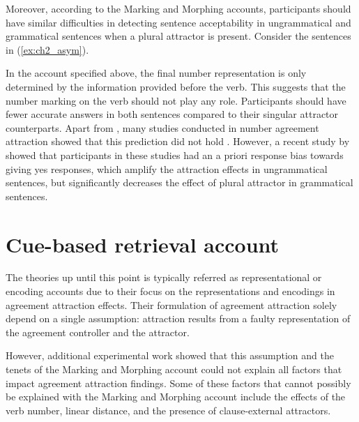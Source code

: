 Moreover, according to the Marking and Morphing accounts, participants should have similar difficulties in detecting sentence acceptability in ungrammatical and grammatical sentences when a plural attractor is present. Consider the sentences in (\ref{ex:ch2_asym}). 

\ea \label{ex:ch2_asym}
  \z
\z

In the account specified above, the final number representation is only determined by the information provided before the verb. This suggests that the number marking on the verb should not play any role. Participants should have fewer accurate answers in both sentences compared to their singular attractor counterparts. Apart from , many studies conducted in number agreement attraction showed that this prediction did not hold \citep[See][for an overview]{HammerlyEtAl2019}. However, a recent study by  showed that participants in these studies had an a priori response bias towards giving yes responses, which amplify the attraction effects in ungrammatical sentences, but significantly decreases the effect of plural attractor in grammatical sentences.



\section{Cue-based retrieval account} \label{sec:ret}

The theories up until this point is typically referred as representational \citep{HammerlyEtAl2019} or encoding \citep{AvetisyanEtAl:2020} accounts due to their focus on the representations and encodings in agreement attraction effects. Their formulation of agreement attraction solely depend on a single assumption: attraction results from a faulty representation of the agreement controller and the attractor. 

However, additional experimental work showed that this assumption and the tenets of the Marking and Morphing account could not explain all factors that impact agreement attraction findings. Some of these factors that cannot possibly be explained with the Marking and Morphing account include the effects of the verb number, linear distance, and the presence of clause-external attractors. 

